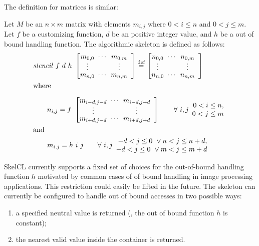 \noindent
The definition for matrices is similar:
\begin{definition}
  \label{definition:mapoverlap:matrix}
  Let $M$ be an $n\times m$ matrix with elements $m_{i,j}$ where $0 < i \leq n$ and $0 < j \leq m$.
  Let $f$ be a customizing function, $d$ be an positive integer value, and $h$ be a out of bound handling function.
  The algorithmic skeleton \stencil is defined as follows:
  \begin{equation*}
    \begin{split}
    & \stencil\ f\  d\ h\ \DottedMatrix{m_{0,0}}{m_{0,m}}{m_{n,0}}{m_{n,m}}
               \eqdef \DottedMatrix{n_{0,0}}{n_{0,m}}{n_{n,0}}{n_{n,m}}\\
               &\text{where}\\[.5em]
    &\qquad n_{i,j} = f\ \DottedMatrix{m_{i-d,j-d}}{m_{i-d,j+d}}{m_{i+d,j-d}}{m_{i+d,j+d}} \qquad \forall\ i,j
        \begin{array}{r} 0 < i \leq n,\\ 0 < j \leq m \end{array}\\
        &\text{and}\\
    &\qquad m_{i,j} = h\ i\ j \qquad \forall\ i,j \begin{array}{r} -d < j \leq 0\ \vee n < j \leq n+d,\\ -d < j \leq 0\ \vee m < j \leq m+d \end{array}
    \end{split}
  \end{equation*}
\end{definition}


SkelCL currently supports a fixed set of choices for the out-of-bound handling function $h$ motivated by common cases of of bound handling in image processing applications.
This restriction could easily be lifted in the future.
The \stencil skeleton can currently be configured to handle out of bound accesses in two possible ways:
\begin{enumerate}
  \item a specified neutral value is returned (\ie, the out of bound function $h$ is constant);
  \item the nearest valid value inside the container is returned.
\end{enumerate}


